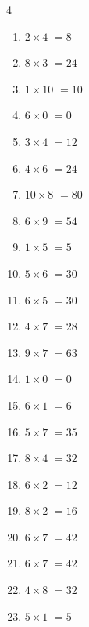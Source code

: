 \begin{multicols}{4}
\begin{enumerate}
  \item $2\times 4$
        $=8$

  \item $8\times 3$
        $=24$

  \item $1\times 10$
        $=10$

  \item $6\times 0$
        $=0$

  \item $3\times 4$
        $=12$

  \item $4\times 6$
        $=24$

  \item $10\times 8$
        $=80$

  \item $6\times 9$
        $=54$

\columnbreak %

  \item $1\times 5$
        $=5$

  \item $5\times 6$
        $=30$

  \item $6\times 5$
        $=30$

  \item $4\times 7$
        $=28$

  \item $9\times 7$
        $=63$

  \item $1\times 0$
        $=0$

  \item $6\times 1$
        $=6$

  \item $5\times 7$
        $=35$

  \item $8\times 4$
        $=32$

  \item $6\times 2$
        $=12$

  \item $8\times 2$
        $=16$

  \item $6\times 7$
        $=42$

  \item $6\times 7$
        $=42$

  \item $4\times 8$
        $=32$

  \item $5\times 1$
        $=5$


\end{enumerate}
\end{multicols}
